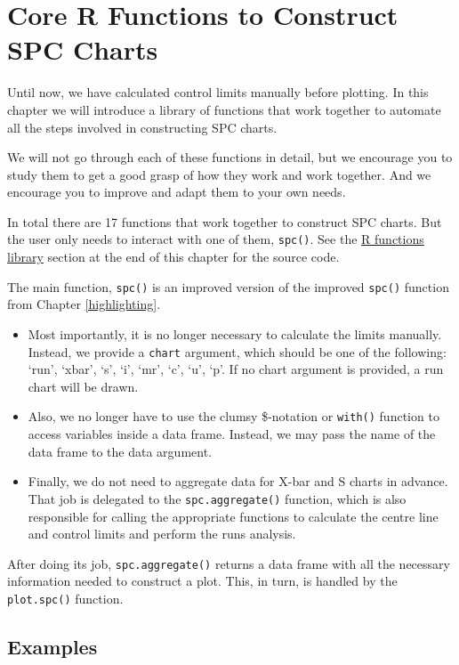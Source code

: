 \documentclass[
]{book}
\begin{document}
\chapter{Core R Functions to Construct SPC Charts}\label{r-functions}

Until now, we have calculated control limits manually before plotting. In this chapter we will introduce a library of functions that work together to automate all the steps involved in constructing SPC charts.

We will not go through each of these functions in detail, but we encourage you to study them to get a good grasp of how they work and work together. And we encourage you to improve and adapt them to your own needs.

In total there are 17 functions that work together to construct SPC charts. But the user only needs to interact with one of them, \texttt{spc()}. See the \hyperref[funs]{R functions library} section at the end of this chapter for the source code.

The main function, \texttt{spc()} is an improved version of the improved \texttt{spc()} function from Chapter \ref{highlighting}.

\begin{itemize}
\item
  Most importantly, it is no longer necessary to calculate the limits manually. Instead, we provide a \texttt{chart} argument, which should be one of the following: `run', `xbar', `s', `i', `mr', `c', `u', `p'. If no chart argument is provided, a run chart will be drawn.
\item
  Also, we no longer have to use the clumsy \$-notation or \texttt{with()} function to access variables inside a data frame. Instead, we may pass the name of the data frame to the data argument.
\item
  Finally, we do not need to aggregate data for X-bar and S charts in advance. That job is delegated to the \texttt{spc.aggregate()} function, which is also responsible for calling the appropriate functions to calculate the centre line and control limits and perform the runs analysis.
\end{itemize}

After doing its job, \texttt{spc.aggregate()} returns a data frame with all the necessary information needed to construct a plot. This, in turn, is handled by the \texttt{plot.spc()} function.

\section{Examples}\label{examples}
\end{document}
